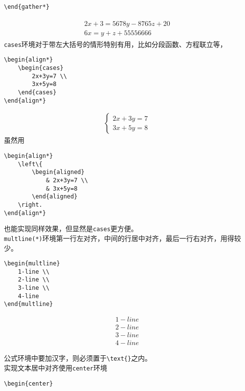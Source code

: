 \documentclass{article}
\begin{document}
\begin{multicols}{2}
\begin{enumerate}
\begin{lstlisting}
\end{gather*}    
\end{lstlisting} 
\begin{gather}
    \boxed{
    \begin{gathered}
        2x+3 = 5678y-8765z + 20 \label{aaa2}\\
        6x = y+z + 55556666 
    \end{gathered} }
\end{gather}
\verb|cases|环境对于带左大括号的情形特别有用，比如分段函数、方程联立等，
\begin{lstlisting}
\begin{align*}
    \begin{cases}
        2x+3y=7 \\
        3x+5y=8
    \end{cases}
\end{align*}    
\end{lstlisting} 
\begin{align*}
    \boxed{
    \begin{cases}
        2x+3y=7 \\
        3x+5y=8
    \end{cases} }
\end{align*}
虽然用
\begin{lstlisting}
\begin{align*}
    \left\{  
        \begin{aligned}
            & 2x+3y=7 \\
            & 3x+5y=8
        \end{aligned}  
    \right.
\end{align*}    
\end{lstlisting} 
也能实现同样效果，但显然是\verb|cases|更方便。\\
\verb|multline(*)|环境第一行左对齐，中间的行居中对齐，最后一行右对齐，用得较少。
\begin{lstlisting}
\begin{multline}
    1-line \\
    2-line \\
    3-line \\
    4-line 
\end{multline}    
\end{lstlisting}
\begin{tcolorbox} 
    \vspace{-5mm}
    \begin{multline}
        1-line \\
        2-line \\
        3-line \\
        4-line 
    \end{multline}
\end{tcolorbox}
公式环境中要加汉字，则必须置于\verb|\text{}|之内。\\
实现文本居中对齐使用\verb|center|环境
\begin{lstlisting}
\begin{center}


\end{lstlisting}
\end{enumerate}
\end{multicols}
\end{document}
